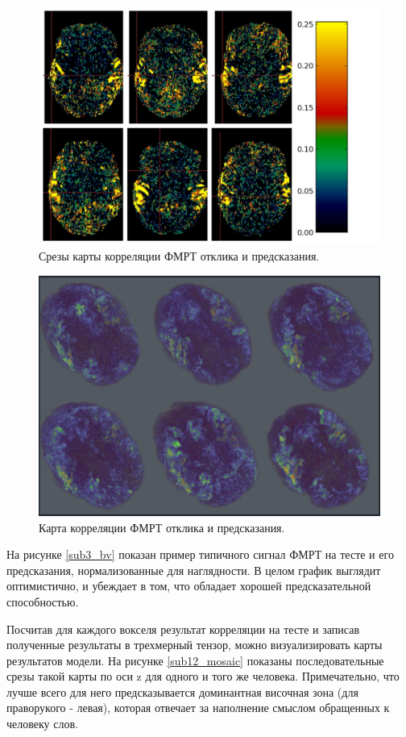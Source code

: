 \documentclass[pdftex,ptm,12pt,a4paper]{report}
\theoremstyle{definition}
\begin{document}
\begin{figure}[h]
\includegraphics[scale=0.4]{images/all_6.png}
\centering
\caption{Срезы карты корреляции ФМРТ отклика и предсказания.}
\label{slices}
\end{figure}

\begin{figure}[h]
\includegraphics[scale=0.4]{images/all6_3d.png}
\centering
\caption{Карта корреляции ФМРТ отклика и предсказания.}
\label{slices_3d}
\end{figure}

На рисунке \ref{sub3_bv} показан пример типичного сигнал ФМРТ на тесте и его предсказания, нормализованные для наглядности. В целом график выглядит оптимистично, и убеждает в том, что обладает хорошей предсказательной способностью.

Посчитав для каждого вокселя результат корреляции на тесте и записав полученные результаты в трехмерный тензор, можно визуализировать карты результатов модели. На рисунке \ref{sub12_mosaic} показаны последовательные срезы такой карты по оси z для одного и того же человека. Примечательно, что лучше всего для него предсказывается доминантная височная зона (для праворукого - левая), которая отвечает за наполнение смыслом обращенных к человеку слов.
 
\end{document}
